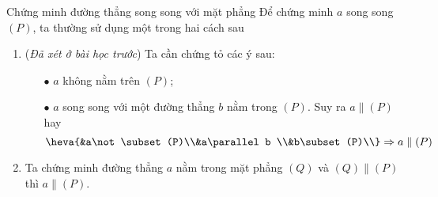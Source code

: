 \begin{dang}{Chứng minh đường thẳng song song với mặt phẳng}
	Để chứng minh $a$ song song $(P)$, ta thường sử dụng một trong hai cách sau
	\begin{enumerate}[\iconMT]
		\item {} (\textit{Đã xét ở bài học trước}) Ta cần chứng tỏ các ý sau:
		\begin{itemize}
			\item [$\bullet$] $a$ không nằm trên $(P)$;
			\item [$\bullet$] $a$ song song với một đường thẳng $b$ nằm trong $(P)$. Suy ra $a\parallel (P)$ hay $$\heva{&a\not\subset (P)\\&a\parallel b \\&b\subset (P)\\}\Rightarrow a\parallel (P)$$
		\end{itemize}
		\item {} Ta chứng minh đường thẳng $a$ nằm trong mặt
		phẳng $(Q)$ và $(Q)\parallel (P)$ thì $a \parallel (P)$.
	\end{enumerate}
\end{dang}

